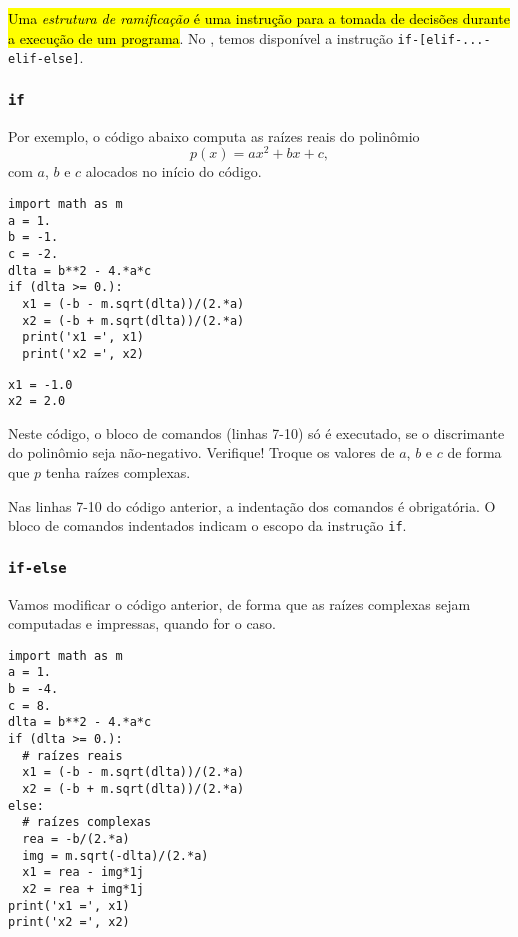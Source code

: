\documentclass[a4paper,10pt,twoside]{article}
\begin{document}
\hl{Uma \emph{estrutura de ramificação} é uma instrução para a tomada de decisões durante a execução de um programa}. No {\python}, temos disponível a instrução \texttt{if-[elif-...-elif-else]}.

\subsubsection{\texttt{if}}

Por exemplo, o código abaixo computa as raízes reais do polinômio
\begin{equation}
  p(x) = ax^2 + bx + c,
\end{equation}  
com $a$, $b$ e $c$ alocados no início do código.

\begin{lstlisting}
import math as m
a = 1.
b = -1.
c = -2.
dlta = b**2 - 4.*a*c
if (dlta >= 0.):
  x1 = (-b - m.sqrt(dlta))/(2.*a)
  x2 = (-b + m.sqrt(dlta))/(2.*a)
  print('x1 =', x1)
  print('x2 =', x2)
\end{lstlisting}

\begin{verbatim}
x1 = -1.0
x2 = 2.0
\end{verbatim}

Neste código, o bloco de comandos (linhas 7-10) só é executado, se o discrimante do polinômio seja não-negativo. Verifique! Troque os valores de $a$, $b$ e $c$ de forma que $p$ tenha raízes complexas.

\begin{obs}
  Nas linhas 7-10 do código anterior, a indentação dos comandos é obrigatória. O bloco de comandos indentados indicam o escopo da instrução \texttt{if}.
\end{obs}

\subsubsection{\texttt{if-else}}

Vamos modificar o código anterior, de forma que as raízes complexas sejam computadas e impressas, quando for o caso.

\begin{lstlisting}
import math as m
a = 1.
b = -4.
c = 8.
dlta = b**2 - 4.*a*c
if (dlta >= 0.):
  # raízes reais
  x1 = (-b - m.sqrt(dlta))/(2.*a)
  x2 = (-b + m.sqrt(dlta))/(2.*a)
else:
  # raízes complexas
  rea = -b/(2.*a)
  img = m.sqrt(-dlta)/(2.*a)
  x1 = rea - img*1j
  x2 = rea + img*1j
print('x1 =', x1)
print('x2 =', x2)
\end{lstlisting}
\end{document}
